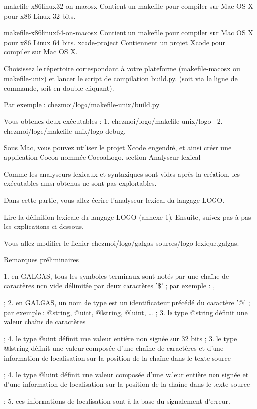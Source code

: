 makefile-x86linux32-on-macosx	Contient un makefile pour compiler sur Mac OS X pour x86 Linux 32 bits.

makefile-x86linux64-on-macosx	Contient un makefile pour compiler sur Mac OS X pour x86 Linux 64 bits.
xcode-project	Contiennent un projet Xcode pour compiler sur Mac OS X.

Choisissez le répertoire correspondant à votre plateforme (makefile-macosx ou makefile-unix) et lancer le script de compilation build.py. (soit via la ligne de commande, soit en double-cliquant).

Par exemple :
	chezmoi/logo/makefile-unix/build.py

Vous obtenez deux exécutables :
1.	chezmoi/logo/makefile-unix/logo ;
2.	chezmoi/logo/makefile-unix/logo-debug.

Sous Mac, vous pouvez utiliser le projet Xcode engendré, et ainsi créer une application Cocoa nommée CocoaLogo.
section {Analyseur lexical}

Comme les analyseurs lexicaux et syntaxiques sont vides après la création, les exécutables ainsi obtenus ne sont pas exploitables.

Dans cette partie, vous allez écrire l’analyseur lexical du langage LOGO.

Lire la définition lexicale du langage LOGO (annexe 1). Ensuite, suivez pas à pas les explications ci-dessous.

Vous allez modifier le fichier 
chezmoi/logo/galgas-sources/logo-lexique.galgas.

Remarques préliminaires

1.	en GALGAS, tous les symboles terminaux sont notés par une chaîne de caractères non vide délimitée par deux caractères '\$' ; par exemple : ,  

;
2.	en GALGAS, un nom de type est un identificateur précédé du caractère '@' ; par exemple : @string, @uint, @lstring, @luint, … ;
3.	le type @string définit une valeur chaîne de caractères 

;
4.	le type @uint définit une valeur entière non signée sur 32 bits ;
3.	le type @lstring définit une valeur composée d'une chaîne de caractères et d'une information de localisation sur la position de la chaîne dans le texte source 

;
4.	le type @luint définit une valeur composée d'une valeur entière non signée et d'une information de localisation sur la position de la chaîne dans le texte source 

;
5.	ces informations de localisation sont à la base du signalement d'erreur.

